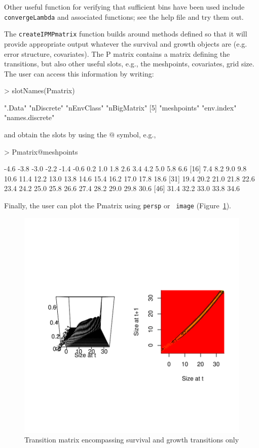 \documentclass{article}
\begin{document}
Other useful function for verifying that sufficient bins have been used include {\tt convergeLambda} and associated functions; see the help file and try them out. 

The {\tt createIPMPmatrix} function builds around methods defined so that it
will provide appropriate output whatever the survival and growth objects are
(e.g. error structure, covariates). The P matrix contains a matrix defining the
transitions, but also other useful slots, e.g., the meshpoints, covariates,
grid size. The user can access this information by writing:
\begin{Schunk}
\begin{Sinput}
> slotNames(Pmatrix)
\end{Sinput}
\begin{Soutput}
[1] ".Data"          "nDiscrete"      "nEnvClass"      "nBigMatrix"    
[5] "meshpoints"     "env.index"      "names.discrete"
\end{Soutput}
\end{Schunk}
and obtain the slots by using the $@$ symbol, e.g., 
\begin{Schunk}
\begin{Sinput}
> Pmatrix@meshpoints
\end{Sinput}
\begin{Soutput}
 [1] -4.6 -3.8 -3.0 -2.2 -1.4 -0.6  0.2  1.0  1.8  2.6  3.4  4.2  5.0  5.8  6.6
[16]  7.4  8.2  9.0  9.8 10.6 11.4 12.2 13.0 13.8 14.6 15.4 16.2 17.0 17.8 18.6
[31] 19.4 20.2 21.0 21.8 22.6 23.4 24.2 25.0 25.8 26.6 27.4 28.2 29.0 29.8 30.6
[46] 31.4 32.2 33.0 33.8 34.6
\end{Soutput}
\end{Schunk}
Finally, the user can plot the Pmatrix using {\tt persp} or {\tt
  image} (Figure~\ref{fig:two}). 
\begin{figure}
\begin{center}
\includegraphics{IPMpack_Vignette-fig2}
\end{center}
\caption{Transition matrix encompassing survival and growth transitions only}
\label{fig:two}
\end{figure}
\end{document}

